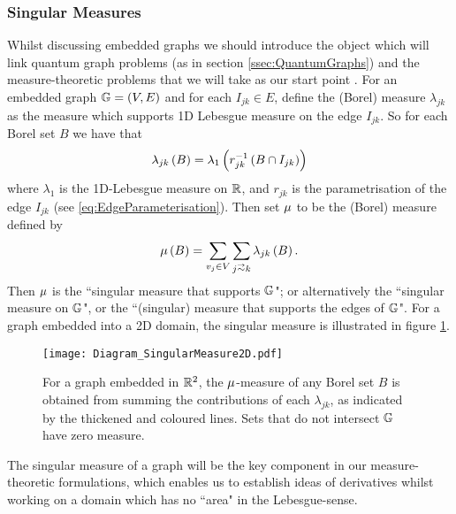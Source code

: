 \subsubsection{Singular Measures} \label{sssec:SingularMeasures}
Whilst discussing embedded graphs we should introduce the object which will link quantum graph problems (as in section \ref{ssec:QuantumGraphs}) and the measure-theoretic problems that we will take as our start point .
For an embedded graph $\mathbb{G} = \left( V,E \right)$ and for each $I_{jk}\in E$, define the (Borel) measure $\lambda_{jk}$ as the measure which supports 1D Lebesgue measure on the edge $I_{jk}$.
So for each Borel set $B$ we have that 
\begin{align*}
	\lambda_{jk}\left( B \right) = \lambda_{1}\left( r_{jk}^{-1}\left( B \cap I_{jk} \right) \right)
\end{align*}
where $\lambda_1$ is the 1D-Lebesgue measure on $\mathbb{R}$, and $r_{jk}$ is the parametrisation of the edge $I_{jk}$ (see \eqref{eq:EdgeParameterisation}).
Then set $\mu$ to be the (Borel) measure defined by
\begin{align*}
	\ddmes\bracs{B} = \sum_{v_j\in V}\sum_{j\conLeft k} \lambda_{jk}\bracs{B}.
\end{align*}
Then $\mu$ is the ``singular measure that supports $\mathbb{G}$"; or alternatively the ``singular measure on $\mathbb{G}$", or the ``(singular) measure that supports the edges of $\mathbb{G}$".
For a graph embedded into a 2D domain, the singular measure is illustrated in figure \ref{fig:Diagram_SingularMeasure2D}.
\begin{figure}[t!]
	\centering
	\texttt{[image: Diagram\_SingularMeasure2D.pdf]}
	\caption{\label{fig:Diagram_SingularMeasure2D} For a graph embedded in $\mathbb{R}^2$, the $\mu$-measure of any Borel set $B$ is obtained from summing the contributions of each $\lambda_{jk}$, as indicated by the thickened and coloured lines.
	Sets that do not intersect $\mathbb{G}$ have zero measure.}
\end{figure} \newline

The singular measure of a graph will be the key component in our measure-theoretic formulations, which enables us to establish ideas of derivatives whilst working on a domain which has no ``area" in the Lebesgue-sense.

